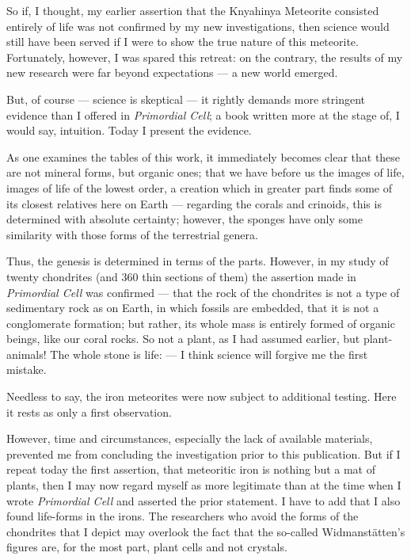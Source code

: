 \documentclass[a4paper, 12pt, oneside]{article}
\begin{document}
So if, I thought, my earlier assertion that the Knyahinya Meteorite consisted entirely of life was not confirmed by my new investigations, then science would still have been served if I were to show the true nature of this meteorite. Fortunately, however, I was spared this retreat: on the contrary, the results of my new research were far beyond expectations --- a new world emerged.

But, of course --- science is skeptical --- it rightly demands more stringent evidence than I offered in \emph{Primordial Cell}; a book written more at the stage of, I would say, intuition. Today I present the evidence.

As one examines the tables of this work, it immediately becomes clear that these are not mineral forms, but organic ones; that we have before us the images of life, images of life of the lowest order, a creation which in greater part finds some of its closest relatives here on Earth --- regarding the corals and crinoids, this is determined with absolute certainty; however, the sponges have only some similarity with those forms of the terrestrial genera.

Thus, the genesis is determined in terms of the parts. However, in my study of twenty chondrites (and 360 thin sections of them) the assertion made in \emph{Primordial Cell} was confirmed --- that the rock of the chondrites is not a type of sedimentary rock as on Earth, in which fossils are embedded, that it is not a conglomerate formation; but rather, its whole mass is entirely formed of organic beings, like our coral rocks. So not a plant, as I had assumed earlier, but plant-animals! The whole stone is life: --- I think science will forgive me the first mistake.

Needless to say, the iron meteorites were now subject to additional testing. Here it rests as only a first observation.

However, time and circumstances, especially the lack of available materials, prevented me from concluding the investigation prior to this publication. But if I repeat today the first assertion, that meteoritic iron is nothing but a mat of plants, then I may now regard myself as more legitimate than at the time when I wrote \emph{Primordial Cell} and asserted the prior statement. I have to add that I also found life-forms in the irons. The researchers who avoid the forms of the chondrites that I depict may overlook the fact that the so-called Widmanstätten's figures are, for the most part, plant cells and not crystals.
\end{document}
